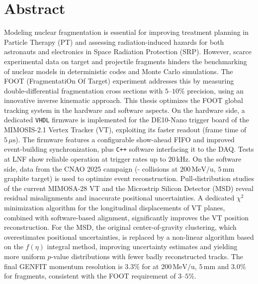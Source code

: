 \cleardoublepage
\chapter*{Abstract}
Modeling nuclear fragmentation is essential for improving treatment planning in Particle Therapy (PT) and assessing radiation-induced hazards for both astronauts and electronics in Space Radiation Protection (SRP). However, scarce experimental data on target and projectile fragments hinders the benchmarking of nuclear models in deterministic codes and Monte Carlo simulations. The FOOT (FragmentatiOn Of Target) experiment addresses this by measuring double-differential fragmentation cross sections with $5$--$10\%$ precision, using an innovative inverse kinematic approach. This thesis optimizes the FOOT global tracking system in the hardware and software aspects. On the hardware side, a dedicated \texttt{VHDL} firmware is implemented for the DE10-Nano trigger board of the MIMOSIS-2.1 Vertex Tracker (VT), exploiting its faster readout (frame time of $5\,\mu\mathrm{s}$). The firmware features a configurable show-ahead FIFO and improved event-building synchronization, plus \texttt{C++} software interfacing it to the DAQ. Tests at LNF show reliable operation at trigger rates up to $20\,\mathrm{kHz}$. On the software side, data from the CNAO 2025 campaign (- collisions at $200\,\mathrm{MeV/u}$, $5\,\mathrm{mm}$ graphite target) is used to optimize event reconstruction. Pull-distribution studies of the current MIMOSA-28 VT and the Microstrip Silicon Detector (MSD) reveal residual misalignments and inaccurate positional uncertainties. A dedicated $\chi^2$ minimization algorithm for the longitudinal displacements of VT planes, combined with software-based alignment, significantly improves the VT position reconstruction. For the MSD, the original center-of-gravity clustering, which overestimates positional uncertainties, is replaced by a non-linear algorithm based on the $f(\eta)$ integral method, improving uncertainty estimates and yielding more uniform $p$-value distributions with fewer badly reconstructed tracks. The final GENFIT momentum resolution is $3.3\%$ for  at $200\,\mathrm{MeV/u}$, $5\,\mathrm{mm}$ and $3.0\%$ for  fragments, consistent with the FOOT requirement of $3$--$5\%$.
